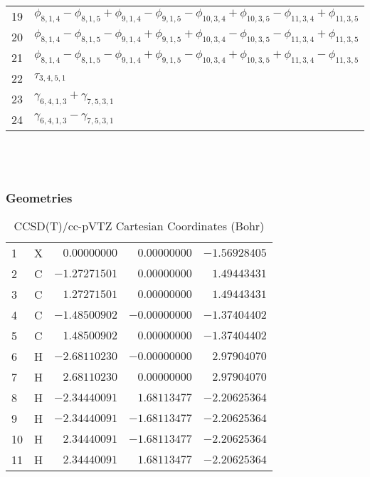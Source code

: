 \documentclass[10pt,oneside]{article}
\begin{document}
\begin{table}[h!]
\begin{tabular}{ll}
  19  & $\phi_{8,1,4} - \phi_{8,1,5} + \phi_{9,1,4} - \phi_{9,1,5} - \phi_{10,3,4} + \phi_{10,3,5} - \phi_{11,3,4} + \phi_{11,3,5}$ \\
  20  & $\phi_{8,1,4} - \phi_{8,1,5} - \phi_{9,1,4} + \phi_{9,1,5} + \phi_{10,3,4} - \phi_{10,3,5} - \phi_{11,3,4} + \phi_{11,3,5}$ \\
  21  & $\phi_{8,1,4} - \phi_{8,1,5} - \phi_{9,1,4} + \phi_{9,1,5} - \phi_{10,3,4} + \phi_{10,3,5} + \phi_{11,3,4} - \phi_{11,3,5}$ \\
  22  & $\tau_{3,4,5,1}$ \\
  23  & $\gamma_{6,4,1,3} + \gamma_{7,5,3,1}$ \\
  24  & $\gamma_{6,4,1,3} - \gamma_{7,5,3,1}$ \\
\end{tabular}
\end{table}

\clearpage

\subsection{\ \ \ }

\subsubsection*{Geometries}
\begin{table}[h!]
\centering
\caption{CCSD(T)/cc-pVTZ Cartesian Coordinates (Bohr)}
\begin{tabular}{llrrr}
1  & X  & $ 0.00000000$ & $ 0.00000000$ & $-1.56928405$ \\
2  & C  & $-1.27271501$ & $ 0.00000000$ & $ 1.49443431$ \\
3  & C  & $ 1.27271501$ & $ 0.00000000$ & $ 1.49443431$ \\
4  & C  & $-1.48500902$ & $-0.00000000$ & $-1.37404402$ \\
5  & C  & $ 1.48500902$ & $ 0.00000000$ & $-1.37404402$ \\
6  & H  & $-2.68110230$ & $-0.00000000$ & $ 2.97904070$ \\
7  & H  & $ 2.68110230$ & $ 0.00000000$ & $ 2.97904070$ \\
8  & H  & $-2.34440091$ & $ 1.68113477$ & $-2.20625364$ \\
9  & H  & $-2.34440091$ & $-1.68113477$ & $-2.20625364$ \\
10 & H  & $ 2.34440091$ & $-1.68113477$ & $-2.20625364$ \\
11 & H  & $ 2.34440091$ & $ 1.68113477$ & $-2.20625364$ \\
\end{tabular}
\end{table}
\end{document}
